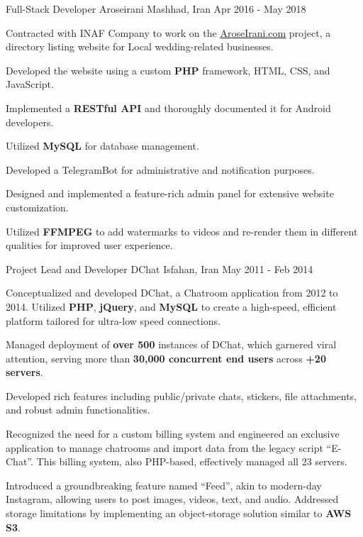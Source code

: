 \begin{cventries}
  \cventry
    {Full-Stack Developer} %
    {Aroseirani} %
    {Mashhad, Iran} %
    {Apr 2016 - May 2018} %
    {
      \begin{cvitems} %
        \item {Contracted with INAF Company to work on the \href{https://aroseirani.com}{\underline{AroseIrani.com}} project, a directory listing website for Local wedding-related businesses.}
        \item {Developed the website using a custom \textbf{PHP} framework, HTML, CSS, and JavaScript.}
        \item {Implemented a \textbf{RESTful API} and thoroughly documented it for Android developers.}
        \item {Utilized \textbf{MySQL} for database management.}
        \item {Developed a TelegramBot for administrative and notification purposes.}
        \item {Designed and implemented a feature-rich admin panel for extensive website customization.}
        \item {Utilized \textbf{FFMPEG} to add watermarks to videos and re-render them in different qualities for improved user experience.}
      \end{cvitems}
    }
  
  \cventry
    {Project Lead and Developer} %
    {DChat} %
    {Isfahan, Iran} %
    {May 2011 - Feb 2014} %
    {
      \begin{cvitems} %
        \item {Conceptualized and developed DChat, a Chatroom application from 2012 to 2014. Utilized \textbf{PHP}, \textbf{jQuery}, and \textbf{MySQL} to create a high-speed, efficient platform tailored for ultra-low speed connections.}
        \item {Managed deployment of \textbf{over 500} instances of DChat, which garnered viral attention, serving more than \textbf{30,000 concurrent end users} across \textbf{+20 servers}.}
        \item {Developed rich features including public/private chats, stickers, file attachments, and robust admin functionalities.}
        \item {Recognized the need for a custom billing system and engineered an exclusive application to manage chatrooms and import data from the legacy script “E-Chat”. This billing system, also PHP-based, effectively managed all 23 servers.}
        \item {Introduced a groundbreaking feature named “Feed”, akin to modern-day Instagram, allowing users to post images, videos, text, and audio. Addressed storage limitations by implementing an object-storage solution similar to \textbf{AWS S3}.}
      \end{cvitems}
    }

\end{cventries}
